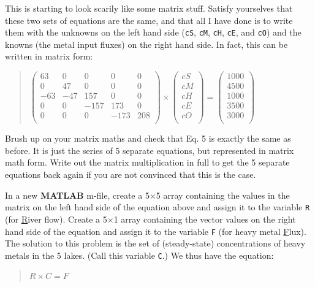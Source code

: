 \documentclass{tufte-book} %
\newenvironment{docspec}{\begin{quotation}\ttfamily\parskip0pt\parindent0pt\ignorespaces}{\end{quotation}}
\begin{document}
This is starting to look scarily like some matrix stuff. Satisfy yourselves that these two sets of equations  are the same, and that all I have done is to write them with the unknowns on the left hand side (\texttt{cS}, \texttt{cM}, \texttt{cH}, \texttt{cE}, and \texttt{cO}) and the knowns (the metal input fluxes) on the right hand side. In fact, this can be written in matrix form:

\begin{docspec}
\(\begin{pmatrix}
63 & 0 & 0 & 0 & 0 \\
0 & 47 & 0 & 0 & 0 \\
-63 & -47 & 157 & 0 & 0 \\
0 & 0 & -157 & 173 & 0 \\
0 & 0 & 0 & -173 & 208 \\
\end{pmatrix}
\times
\begin{pmatrix}
cS \\
cM \\
cH \\
cE \\
cO \\
\end{pmatrix}
=
\begin{pmatrix}
1000 \\
4500 \\
1000 \\
3500 \\
3000 \\
\end{pmatrix}\)
\end{docspec}

Brush up on your matrix maths and check that Eq. 5 is exactly the same as before. It is just the series of 5 separate equations, but represented in matrix math form. Write out the matrix multiplication in full to get the 5 separate equations back again if you are not convinced that this is the case.

In a new \textbf{MATLAB} \textsf{m-file}, create a 5\(\times\)5 array containing the values in the matrix on the left hand side of the equation above and assign it to the variable \texttt{R} (for \uline{R}iver flow). Create a 5\(\times\)1 array containing the vector values on the right hand side of the equation and assign it to the variable \texttt{F} (for heavy metal \uline{F}lux). The solution to this problem is the set of (steady-state) concentrations of heavy metals in the 5 lakes. (Call this variable \texttt{C}.) We thus have the equation:
\begin{docspec}
\(R \times C = F\)
\end{docspec}
\end{document}
